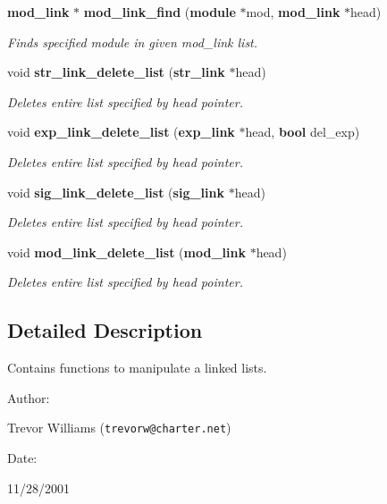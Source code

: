 \begin{CompactItemize}
{\bf mod\_\-link} $\ast$ {\bf mod\_\-link\_\-find} ({\bf module} $\ast$mod, {\bf mod\_\-link} $\ast$head)
\begin{CompactList}\small\item\em Finds specified module in given mod\_\-link list.\item\end{CompactList}\item 
void {\bf str\_\-link\_\-delete\_\-list} ({\bf str\_\-link} $\ast$head)
\begin{CompactList}\small\item\em Deletes entire list specified by head pointer.\item\end{CompactList}\item 
void {\bf exp\_\-link\_\-delete\_\-list} ({\bf exp\_\-link} $\ast$head, {\bf bool} del\_\-exp)
\begin{CompactList}\small\item\em Deletes entire list specified by head pointer.\item\end{CompactList}\item 
void {\bf sig\_\-link\_\-delete\_\-list} ({\bf sig\_\-link} $\ast$head)
\begin{CompactList}\small\item\em Deletes entire list specified by head pointer.\item\end{CompactList}\item 
void {\bf mod\_\-link\_\-delete\_\-list} ({\bf mod\_\-link} $\ast$head)
\begin{CompactList}\small\item\em Deletes entire list specified by head pointer.\item\end{CompactList}\end{CompactItemize}


\subsection{Detailed Description}
Contains functions to manipulate a linked lists.



\begin{Desc}
\item[Author: ]\par
Trevor Williams ({\tt trevorw@charter.net}) \end{Desc}
\begin{Desc}
\item[Date: ]\par
11/28/2001\end{Desc}


